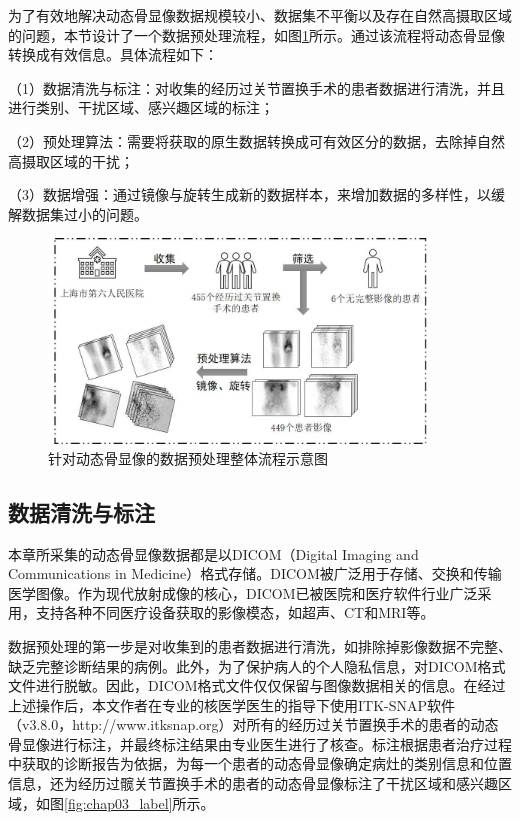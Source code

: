 为了有效地解决动态骨显像数据规模较小、数据集不平衡以及存在自然高摄取区域的问题，本节设计了一个数据预处理流程，如图\ref{fig:chap03_preprocess}所示。通过该流程将动态骨显像转换成有效信息。具体流程如下：

（1）数据清洗与标注：对收集的经历过关节置换手术的患者数据进行清洗，并且进行类别、干扰区域、感兴趣区域的标注；

（2）预处理算法：需要将获取的原生数据转换成可有效区分的数据，去除掉自然高摄取区域的干扰；

（3）数据增强：通过镜像与旋转生成新的数据样本，来增加数据的多样性，以缓解数据集过小的问题。

\begin{figure}[htbp]
  \centering
  \includegraphics[width=0.9\textwidth]{figures/chap03_preprocess.jpg}
  \caption{针对动态骨显像的数据预处理整体流程示意图}
  \label{fig:chap03_preprocess}
\end{figure}

\subsection{数据清洗与标注}

本章所采集的动态骨显像数据都是以DICOM（Digital Imaging and Communications in Medicine）格式存储。DICOM被广泛用于存储、交换和传输医学图像。作为现代放射成像的核心，DICOM已被医院和医疗软件行业广泛采用，支持各种不同医疗设备获取的影像模态，如超声、CT和MRI等\cite{mildenberger2002introduction}。

数据预处理的第一步是对收集到的患者数据进行清洗，如排除掉影像数据不完整、缺乏完整诊断结果的病例。此外，为了保护病人的个人隐私信息，对DICOM格式文件进行脱敏。因此，DICOM格式文件仅仅保留与图像数据相关的信息。在经过上述操作后，本文作者在专业的核医学医生的指导下使用ITK-SNAP软件（v3.8.0，http://www.itksnap.org）对所有的经历过关节置换手术的患者的动态骨显像进行标注，并最终标注结果由专业医生进行了核查。标注根据患者治疗过程中获取的诊断报告为依据，为每一个患者的动态骨显像确定病灶的类别信息和位置信息，还为经历过髋关节置换手术的患者的动态骨显像标注了干扰区域和感兴趣区域，如图\ref{fig:chap03_label}所示。

